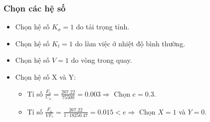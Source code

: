             \subsubsection{Chọn các hệ số}
                \begin{itemize}
                    \item Chọn hệ số $K_{\sigma} = 1$ do tải trọng tỉnh.
                    \item Chọn hệ số $K_{t} = 1$ do làm việc ở nhiệt độ bình thường.
                    \item Chọn hệ số $V = 1$ do vòng trong quay.
                    \item Chọn hệ số X và Y:
                        \begin{itemize}
                            \item Tỉ số $\frac{F_{a}}{C_{o}} = \frac{267.22}{75500} = 0.003 \Rightarrow$ Chọn $e = 0.3$.
                            \item Tỉ số $\frac{F_{a}}{VF_{r}} = \frac{267.22}{1 \cdot 18250.47} = 0.015 < e \Rightarrow$ Chọn $X = 1$ và $Y = 0$.
                        \end{itemize}
                \end{itemize}
